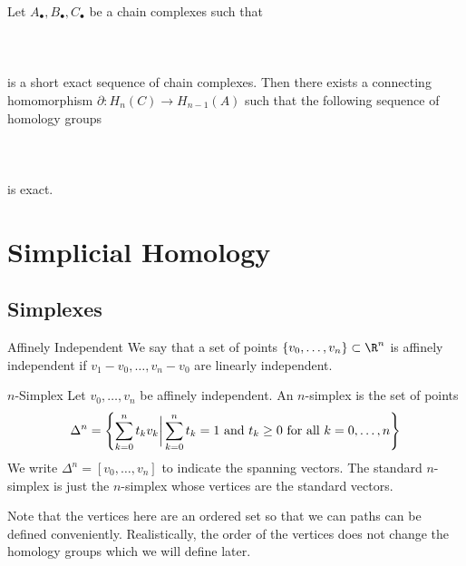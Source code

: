 \documentclass[a4paper]{article}
\begin{document}
\begin{thm}{}{} Let $A_\bullet,B_\bullet,C_\bullet$ be a chain complexes such that \\~\\
\\~\\
is a short exact sequence of chain complexes. Then there exists a connecting homomorphism $\partial:H_n(C)\to H_{n-1}(A)$ such that the following sequence of homology groups \\~\\
\\~\\
is exact. 
\end{thm}

\pagebreak
\section{Simplicial Homology}
\subsection{Simplexes}
\begin{defn}{Affinely Independent}{}{} We say that a set of points $\{v_0,\dots,v_n\}\subset\R^n$ is affinely independent if $v_1-v_0,\dots,v_n-v_0$ are linearly independent. 
\end{defn}

\begin{defn}{$n$-Simplex}{} Let $v_0,\dots,v_n$ be affinely independent. An $n$-simplex is the set of points $$\Delta^n=\left\{\sum_{k=0}^nt_kv_k\bigg{|}\sum_{k=0}^nt_k=1\text{ and }t_k\geq 0\text{ for all }k=0,\dots,n\right\}$$ We write $\Delta^n=[v_0,\dots,v_n]$ to indicate the spanning vectors. The standard $n$-simplex is just the $n$-simplex whose vertices are the standard vectors. 
\end{defn}

Note that the vertices here are an ordered set so that we can paths can be defined conveniently. Realistically, the order of the vertices does not change the homology groups which we will define later. 
\end{document}
